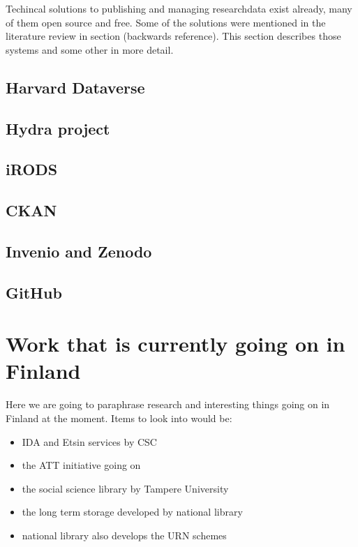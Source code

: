 Techincal solutions to publishing and managing researchdata exist already, many
of them open source and free. Some of the solutions were mentioned in the
literature review in section (backwards reference). This section describes
those systems and some other in more detail.

\subsection{Harvard Dataverse}

\subsection{Hydra project}

\subsection{iRODS}

\subsection{CKAN}

\subsection{Invenio and Zenodo}

\subsection{GitHub}

\section{Work that is currently going on in Finland}
\label{sec:finland_current}

Here we are going to paraphrase research and interesting things going on in
Finland at the moment. Items to look into would be:

\begin{itemize}
    \item IDA and Etsin services by CSC
    \item the ATT initiative going on
    \item the social science library by Tampere University
    \item the long term storage developed by national library
    \item national library also develops the URN schemes
\end{itemize}

